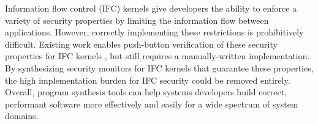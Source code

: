 Information flow control (IFC) kernels give developers the ability to enforce
a variety of security properties by limiting the information flow between applications.
However, correctly implementing these restrictions is prohibitively difficult.
Existing work enables push-button verification of these security properties for IFC kernels \cite{sigurbjarnarson:nickel},
but still requires a manually-written implementation.
By synthesizing security monitors for IFC kernels that guarantee these properties,
the high implementation burden for IFC security could be removed entirely.
Overall, program synthesis tools can help systems developers build correct, performant software
more effectively and easily for a wide spectrum of system domains.

